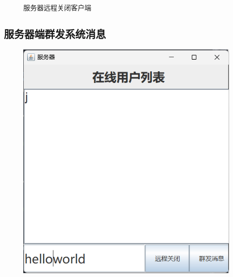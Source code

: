 \documentclass[UTF8,12pt]{article}
\begin{document}
\begin{figure}[htbp]
\begin{minipage}{0.4\textwidth}
    \end{minipage}
    \caption{服务器远程关闭客户端}
\end{figure}

\subsection{服务器端群发系统消息}
\begin{figure}[htbp]
    \centering
    \begin{minipage}{0.4\textwidth}
        \centering
        \includegraphics[width=1.0\textwidth]{img/27.png}
    \end{minipage}
    \begin{minipage}{0.4\textwidth}
        \centering

\end{minipage}
\end{figure}
\end{document}
